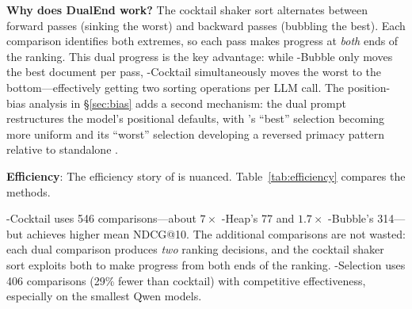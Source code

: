 \textbf{Why does DualEnd work?} The cocktail shaker sort alternates between forward passes (sinking the worst) and backward passes (bubbling the best). Each comparison identifies both extremes, so each pass makes progress at \emph{both} ends of the ranking. This dual progress is the key advantage: while \topdown{}-Bubble only moves the best document per pass, \dualend{}-Cocktail simultaneously moves the worst to the bottom---effectively getting two sorting operations per LLM call. The position-bias analysis in \S\ref{sec:bias} adds a second mechanism: the dual prompt restructures the model's positional defaults, with \dualend{}'s ``best'' selection becoming more uniform and its ``worst'' selection developing a reversed primacy pattern relative to standalone \bottomup{}.

\textbf{Efficiency}: The efficiency story of \dualend{} is nuanced. Table~\ref{tab:efficiency} compares the methods.

\begin{table}[!htbp]
\caption{Efficiency comparison for top-$k{=}10$ ranking of $n{=}100$ documents with $c{=}3$. Theoretical complexity and empirical measurements (per query, averaged across DL 2019).}
\label{tab:efficiency}
\small
{}
\end{table}

\dualend{}-Cocktail uses 546 comparisons---about $7\times$ \topdown{}-Heap's 77 and $1.7\times$ \topdown{}-Bubble's 314---but achieves higher mean NDCG@10. The additional comparisons are not wasted: each dual comparison produces \emph{two} ranking decisions, and the cocktail shaker sort exploits both to make progress from both ends of the ranking. \dualend{}-Selection uses 406 comparisons (29\% fewer than cocktail) with competitive effectiveness, especially on the smallest Qwen models.

